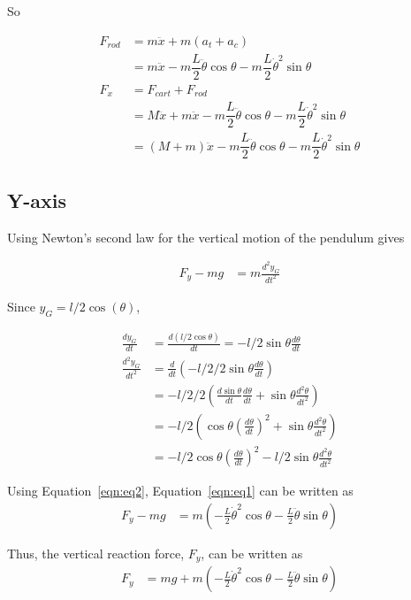 \documentclass{notes}
\begin{document}
So 

\begin{align*}
  F_{rod} & = m \ddot{x} + m (a_{t} + a_{c}) \\
         & = m \ddot{x} -m\dfrac{L}{2} \ddot{\theta} \cos \theta 
                        -m\dfrac{L}{2} \dot{\theta}^2 \sin \theta \\
  F_x & = F_{cart} + F_{rod} \\
      & = M\ddot{x} + m \ddot{x} - m\dfrac{L}{2} \ddot{\theta} \cos \theta 
                    - m \dfrac{L}{2} \dot{\theta}^2 \sin \theta \\
      & = (M + m) \ddot{x} - m\dfrac{L}{2} \ddot{\theta} \cos \theta 
                    - m \dfrac{L}{2} \dot{\theta}^2 \sin \theta
\end{align*}
\FloatBarrier


\subsection{Y-axis}
Using Newton's second law for the vertical motion of the pendulum gives

\begin{align}
  F_y - mg & = m\frac{d^2y_G}{dt^2}\label{eqn:eq1}
 \end{align}
 
 Since $ y_G = l/2\cos(\theta)$,

 \begin{align}
   \frac{dy_G}{dt} & = \frac{d(l/2\cos\theta)}{dt} = -l/2\sin\theta\frac{d\theta}{dt} \nonumber\\
   \frac{d^2y_G}{dt^2} & = \frac{d}{dt}\left(-l/2/2 \sin\theta \frac{d\theta}{dt}\right) \nonumber\\
   & = -l/2/2\left(\frac{d\sin\theta}{dt}\frac{d\theta}{dt} + \sin\theta\frac{d^2\theta}{dt^2}\right) \nonumber\\
   & = -l/2\left( \cos\theta \left(\frac{d\theta}{dt}\right)^2 + \sin\theta\frac{d^2\theta}{dt^2}   \right) \nonumber\\
   & = -l/2\cos\theta\left(\frac{d\theta}{dt}\right)^2-l/2\sin\theta\frac{d^2\theta}{dt^2}\label{eqn:eq2}
 \end{align}
 
 Using Equation~\ref{eqn:eq2}, Equation~\ref{eqn:eq1} can be written as 
 \begin{align*}
   F_y - mg & = m(-\frac{L}{2}\dot{\theta}^2\cos\theta - \frac{L}{2}\ddot{\theta}\sin\theta )
 \end{align*}
 
 Thus, the vertical reaction force, $F_y$, can be written as
 \begin{align*}
   F_y & = mg + m\left(-\frac{L}{2}\dot{\theta}^2\cos\theta - \frac{L}{2}\ddot{\theta}\sin\theta\right)
 \end{align*}
\end{document}

